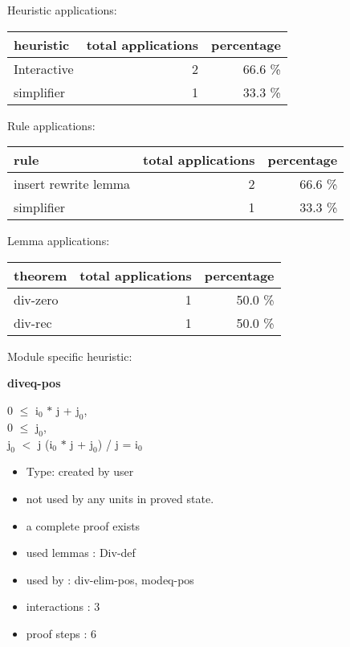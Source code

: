 \documentclass[a4paper]{article}
\begin{document}
\medskip


Heuristic applications:

\begin{supertabular}{l|r|r}
heuristic	& total applications & percentage \\ \hline
Interactive & 2 & 66.6 \% \\
simplifier & 1 & 33.3 \% \\

\end{supertabular}

Rule applications:

\begin{supertabular}{l|r|r}
rule	        & total applications & percentage \\ \hline
insert rewrite lemma & 2 & 66.6 \% \\
simplifier & 1 & 33.3 \% \\

\end{supertabular}

Lemma applications:

\begin{supertabular}{l|r|r}
theorem	        & total applications & percentage \\ \hline
div-zero & 1 & 50.0 \% \\
div-rec & 1 & 50.0 \% \\

\end{supertabular}

Module specific heuristic:

\pagebreak

{\LARGE\bf diveq-pos}\label{lemma-diveq-pos}

\medskip

0 $\le$ $\mbox{i}_{0}$ $*$ j + $\mbox{j}_{0}$, \\
0 $\le$ $\mbox{j}_{0}$, \\
$\mbox{j}_{0}$ $<$ j \Fol ($\mbox{i}_{0}$ $*$ j + $\mbox{j}_{0}$) / j = $\mbox{i}_{0}$

\begin{itemize}

\item Type: created by user

\item not used by any units in proved state.
\item       a complete proof exists
\item       used lemmas  : Div-def
\item       used by      : div-elim-pos, modeq-pos
\item       interactions : 3
\item       proof steps  : 6
\end{itemize}
\end{document}
